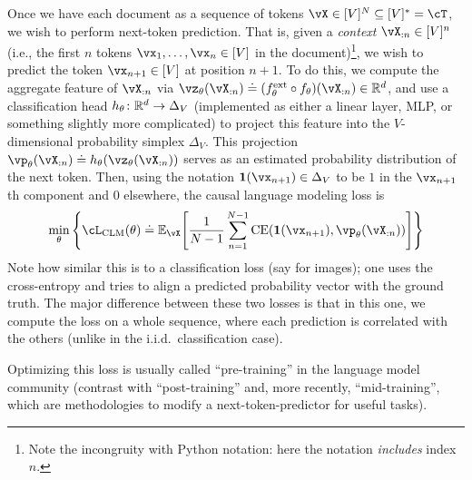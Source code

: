 \documentclass[../../book-main.tex]{subfiles}
\begin{document}
Once we have each document as a sequence of tokens \(\vX \in [V]^{N} \subseteq [V]^{*} = \cT\), we wish to perform next-token prediction. That is, given a \textit{context} \(\vX_{:n} \in [V]^{n}\) (i.e., the first \(n\) tokens \(\vx_{1}, \dots, \vx_{n} \in [V]\) in the document)\footnote{Note the incongruity with Python notation: here the notation \textit{includes} index \(n\).}, we wish to predict the token \(\vx_{n + 1} \in [V]\) at position \(n + 1\). To do this, we compute the aggregate feature of \(\vX_{:n}\) via \(\vz_{\theta}(\vX_{:n}) \doteq (f_{\theta}^{\ext} \circ f_{\theta})(\vX_{:n}) \in \R^{d}\), and use a classification head \(h_{\theta} \colon \mathbb{R}^{d} \to \Delta_{V}\) (implemented as either a linear layer, MLP, or something slightly more complicated) to project this feature into the \(V\)-dimensional probability simplex \(\Delta_{V}\). This projection \(\vp_{\theta}(\vX_{:n}) \doteq h_{\theta}(\vz_{\theta}(\vX_{:n}))\) serves as an estimated probability distribution of the next token. Then, using the notation \(\vone(\vx_{n + 1}) \in \Delta_{V}\) to be \(1\) in the \(\vx_{n + 1}\)th component and \(0\) elsewhere, the causal language modeling loss is
\begin{equation}\label{eq:clm_loss}
    \min_{\theta}\bc{\cL_{\mathrm{CLM}}(\theta) \doteq \Ex_{\vX}\rs{\frac{1}{N - 1}\sum_{n = 1}^{N - 1}\CE(\vone(\vx_{n + 1}), \vp_{\theta}(\vX_{:n}))}}
\end{equation}
Note how similar this is to a classification loss (say for images); one uses the cross-entropy and tries to align a predicted probability vector with the ground truth. The major difference between these two losses is that in this one, we compute the loss on a whole sequence, where each prediction is correlated with the others (unlike in the i.i.d.~classification case). 

Optimizing this loss is usually called ``pre-training'' in the language model community (contrast with ``post-training'' and, more recently, ``mid-training'', which are methodologies to modify a next-token-predictor for useful tasks).
\end{document}
